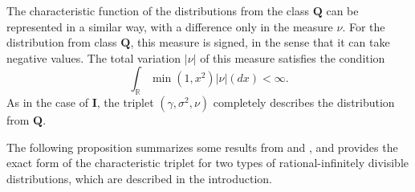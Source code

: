 \documentclass[numbers,webpdf,imaiai]{ima-authoring-template}%
\theoremstyle{thmstyletwo}%
\newcommand{\R}{\mathbb{R}}
\newcommand{\Q}{\pmb{Q}}
\newcommand{\ID}{\pmb{I}}
\numberwithin{equation}{section}
\begin{document}
The characteristic function of the distributions from the class \(\Q\) can be represented in a similar way, with a difference only in the measure \(\nu\). For the distribution from class \(\Q\), this measure is signed, in the sense that it can take negative values. The total variation \(|\nu|\) of this measure satisfies the condition \[\int_{\R}  \min(1, x^2)|\nu|(dx) < \infty.\] 
As in the case of \(\ID\), the triplet \((\gamma, \sigma^2, \nu)\) completely describes the distribution from \(\Q\).

The following proposition summarizes some results from \cite{BK2023} and \cite{LPS2018}, and provides the exact form of the characteristic triplet for two types of rational-infinitely divisible distributions, which are described in the introduction.
\end{document}
